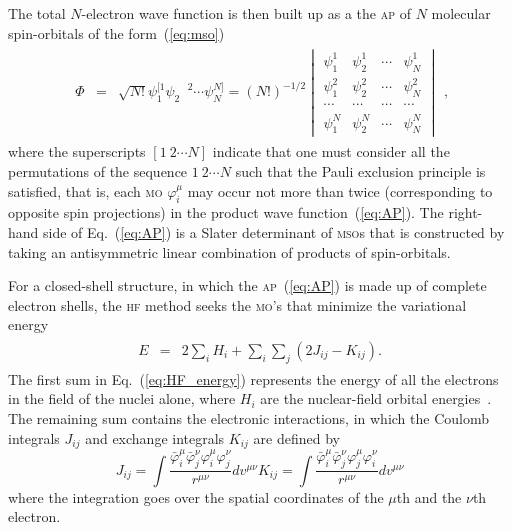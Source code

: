 The total $N$-electron wave function is then built up as a the
\textsc{ap} of $N$ molecular spin-orbitals of the
form~(\ref{eq:mso})~\cite{Roothaan_HF}
%
\begin{eqnarray}
  \begin{split}
    \Phi & = & \sqrt{N!}\psi_{1}^{[1} \psi_{2}^{\phantom{[]}2} \cdots \psi_{N}^{N]} =
    (N!)^{-1/2}
    \begin{vmatrix}
      \psi_{1}^{1} & \psi_{2}^{1} & \cdots & \psi_{N}^{1} \\
      \psi_{1}^{2} & \psi_{2}^{2} & \cdots & \psi_{N}^{2} \\
      \cdots & \cdots & \cdots & \cdots \\
      \psi_{1}^{N} & \psi_{2}^{N} & \cdots & \psi_{N}^{N}
    \end{vmatrix}
  \end{split},
  \label{eq:AP}
\end{eqnarray}
%
where the superscripts $[1\ 2 \cdots N]$ indicate that one must
consider all the permutations of the sequence $1\ 2 \cdots N$ such
that the Pauli exclusion principle is satisfied, that is, each
\textsc{mo} $\varphi_{i}^{\mu}$ may occur not more than twice
(corresponding to opposite spin projections) in the product wave
function~(\ref{eq:AP}). The right-hand side of Eq.~(\ref{eq:AP}) is a
Slater determinant of \textsc{mso}s that is constructed by taking an
antisymmetric linear combination of products of spin-orbitals.

For a closed-shell structure, in which the \textsc{ap}~(\ref{eq:AP})
is made up of complete electron shells, the \textsc{hf} method seeks
the \textsc{mo}'s that minimize the variational
energy~\cite{Roothaan_HF}
%
\begin{eqnarray}
  \begin{split}
    E & = & 2\sum\limits_{i} H_{i} + \sum\limits_{i}\sum\limits_{j} (2J_{ij} -
    K_{ij}).
  \end{split}
  \label{eq:HF_energy}
\end{eqnarray}
%
The first sum in Eq.~(\ref{eq:HF_energy}) represents the energy of all
the electrons in the field of the nuclei alone, where $H_{i}$ are the
nuclear-field orbital energies~\cite{Roothaan_HF}. The remaining sum
contains the electronic interactions, in which the Coulomb integrals
$J_{ij}$ and exchange integrals $K_{ij}$ are defined by
%
\begin{subequations}
  \begin{equation} \label{eq:Coulomb}
    J_{ij} = \int \frac{\bar\varphi_{i}^{\mu} \bar\varphi_{j}^{\nu}
      \varphi_{i}^{\mu} \varphi_{j}^{\nu}}{r^{\mu\nu}} dv^{\mu\nu}
  \end{equation}
  \begin{equation} \label{eq:exchange}
    K_{ij} = \int \frac{\bar\varphi_{i}^{\mu} \bar\varphi_{j}^{\nu}
      \varphi_{j}^{\mu} \varphi_{i}^{\nu}}{r^{\mu\nu}} dv^{\mu\nu}
  \end{equation}
\end{subequations}
%
where the integration goes over the spatial coordinates of the
$\mu$th and the $\nu$th electron.

